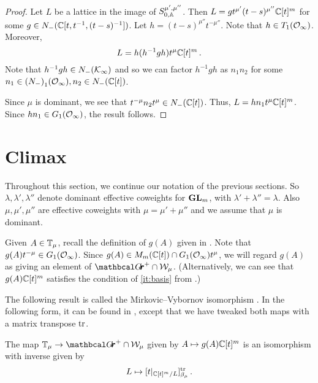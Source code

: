 \documentclass{article} %
\begin{document}
\begin{proof}
    Let $ L $ 
    be a lattice in the image of $S^{\mu',\mu''}_{0,\AA}$. Then $ L = g t^{\mu'} (t-s)^{\mu''}\CC[t]^m$ for some $ g \in N_-(\CC[t, t^{-1}, (t-s)^{-1}]) $.  Let $ h =(t-s)^{\mu''} t^{-\mu''}  $.  Note that $ h \in T_1(\Oinf)$. 
    Moreover,
    $$ L = h (h^{-1} g h) t^{\mu}\CC[t]^m\,. $$
    Note that 
    $h^{-1} g h \in N_-(\cK_\infty)$ and so we can factor $ h^{-1} g h$ as $n_1 n_2$ for some $ n_1 \in {(N_-)}_1(\Oinf), n_2 \in {N_-}(\CC[t]) $. 
    
    Since $ \mu $ is dominant, we see that $ t^{-\mu} n_2 t^\mu \in N_-(\CC[t]) $. %
    Thus, $ L = h n_1 t^\mu \CC[t]^m$.  Since $ hn_1 \in G_1(\Oinf)$, the result follows. %
\end{proof}
% 
\section{Climax}
\label{s:climax}
Throughout this section, we continue our notation of the previous sections. So $ \lambda, \lambda', \lambda''$ denote dominant effective coweights for $ \GL_m$, with $ \lambda' + \lambda'' = \lambda$.  Also $ \mu, \mu', \mu''$ are effective coweights with $ \mu = \mu' + \mu''$ and we assume that $ \mu$ is dominant.

Given $ A \in \TT_\mu$, recall the definition of $ g(A)$ given in .  Note that $g(A)t^{-\mu} \in G_1(\Oinf)$.
Since $ g(A) \in M_m(\CC[t]) \cap G_1(\Oinf)t^\mu$, we will regard $ g(A)$ as giving an element of $ \Grth^+ \cap \cW_\mu$.  (Alternatively, we can see that $ g(A) \CC[t]^m$ satisfies the condition of \cref{it:basis} from .)

The following result is called the Mirkovic--Vybornov isomorphism \cite{mirkovic2007quiver}.  In the following form, it can be found in \cite[Theorem 3.2]{cautis2018categorical}, except that we have tweaked both maps with a matrix transpose $ \tr$.

 
% 
\begin{theorem} 
\label{th:TmuWmu}
The map $ \TT_\mu \rightarrow \Grth^+ \cap \cW_\mu $ given by $ A \mapsto g(A)\CC[t]^m $ is an isomorphism with inverse given by
$$ 
L \mapsto [t|_{\CC[t]^m/L} ]^{\tr}_{\beta_\mu} \,. 
$$
\end{theorem}
% 
\end{document}
